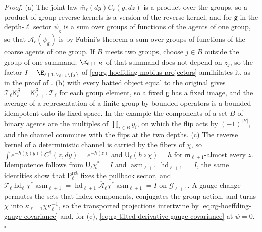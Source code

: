 \noindent\emph{Proof.}
(a) The joint law $\bar{\mathsf m}_\ell(dy)C_\ell(y,dz)$ is a product over the
groups, so a product of group reverse kernels is a version of the reverse kernel,
and for $\mathsf g$ in the depth-$\ell$ sector $\psi_{\mathsf g}$ is a sum over
groups of functions of the agents of one group, so that $\mathcal A_\ell(\psi_{\mathsf
g})$ is by Fubini's theorem a sum over groups of functions of the coarse agents of
one group. If $B$ meets two groups, choose $j\in B$ outside the group of one summand;
$\E_{\ell+1,B}$ of that summand does not depend on $z_j$, so the factor
$I-\E_{\ell+1,V_{\ell+1}\setminus\{j\}}$ of \eqref{eq:rg-hoeffding-mobius-projectors}
annihilates it, as in the proof of .
(b)  with every hatted object equal to
the original gives $\mathcal T_\ell\mathsf K^{\mathcal G}_\ell=\mathsf K^{\mathcal
G}_{\ell+1}\mathcal T_\ell$ for each group element, so a fixed $\mathsf g$ has a
fixed image, and the average of a representation of a finite group by bounded
operators is a bounded idempotent onto its fixed space. In the example the
components of a set $B$ of binary agents are the multiples of $\prod_{i\in B}y_i$,
on which the flip acts by $(-1)^{\lvert B\rvert}$, and the channel commutes with the
flips at the two depths. (c) The reverse kernel of a deterministic channel is
carried by the fibers of $\chi$, so $\int e^{-h(\chi(y))}C^\dagger(z,dy)=e^{-h(z)}$
and $\mathsf U_\ell(h\circ\chi)=h$ for $\bar{\mathsf m}_{\ell+1}$-almost every $z$.
Idempotence follows from $\overline{\mathsf U_\ell}\chi^*=I$ and
$\operatorname{asm}_{\ell+1}\operatorname{hd}_{\ell+1}=I$, the same identities show
that $\mathsf P^{\mathrm{ret}}_\ell$ fixes the pullback sector, and
$\mathcal T_\ell\operatorname{hd}_\ell\chi^*\operatorname{asm}_{\ell+1}
=\operatorname{hd}_{\ell+1}\overline{\mathcal A}_\ell\chi^*\operatorname{asm}_{\ell+1}=I$
on $\mathcal G_{\ell+1}$. A gauge change permutes the sets that index components,
conjugates the group action, and turns $\chi$ into
$\kappa_{\ell+1}\chi\kappa_\ell^{-1}$, so the transported projections intertwine by
\eqref{eq:rg-hoeffding-gauge-covariance} and, for (c),
\eqref{eq:rg-tilted-derivative-gauge-covariance} at $\psi=0$. $\square$

